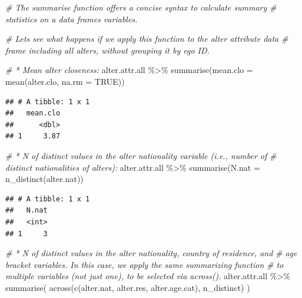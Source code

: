 \documentclass[
]{book}
\newenvironment{Shaded}{\begin{snugshade}}{\end{snugshade}}
\newcommand{\AttributeTok}[1]{\textcolor[rgb]{0.77,0.63,0.00}{#1}}
\newcommand{\CommentTok}[1]{\textcolor[rgb]{0.56,0.35,0.01}{\textit{#1}}}
\newcommand{\ConstantTok}[1]{\textcolor[rgb]{0.00,0.00,0.00}{#1}}
\newcommand{\FunctionTok}[1]{\textcolor[rgb]{0.00,0.00,0.00}{#1}}
\newcommand{\NormalTok}[1]{#1}
\newcommand{\SpecialCharTok}[1]{\textcolor[rgb]{0.00,0.00,0.00}{#1}}
\begin{document}
\begin{Shaded}
\begin{Highlighting}[]
\CommentTok{\# The summarise function offers a concise syntax to calculate summary }
\CommentTok{\# statistics on a data frame\textquotesingle{}s variables. }

\CommentTok{\# Let\textquotesingle{}s see what happens if we apply this function to the alter attribute data}
\CommentTok{\# frame including all alters, without grouping it by ego ID.}

\CommentTok{\# * Mean alter closeness:}
\NormalTok{alter.attr.all }\SpecialCharTok{\%\textgreater{}\%}
  \FunctionTok{summarise}\NormalTok{(}\AttributeTok{mean.clo =} \FunctionTok{mean}\NormalTok{(alter.clo, }\AttributeTok{na.rm =} \ConstantTok{TRUE}\NormalTok{))}
\end{Highlighting}
\end{Shaded}

\begin{verbatim}
## # A tibble: 1 x 1
##   mean.clo
##      <dbl>
## 1     3.87
\end{verbatim}

\begin{Shaded}
\begin{Highlighting}[]
\CommentTok{\# * N of distinct values in the alter nationality variable (i.e., number of }
\CommentTok{\# distinct nationalities of alters):}
\NormalTok{alter.attr.all }\SpecialCharTok{\%\textgreater{}\%}
  \FunctionTok{summarise}\NormalTok{(}\AttributeTok{N.nat =} \FunctionTok{n\_distinct}\NormalTok{(alter.nat))}
\end{Highlighting}
\end{Shaded}

\begin{verbatim}
## # A tibble: 1 x 1
##   N.nat
##   <int>
## 1     3
\end{verbatim}

\begin{Shaded}
\begin{Highlighting}[]
\CommentTok{\# * N of distinct values in the alter nationality, country of residence, and}
\CommentTok{\# age bracket variables. In this case, we apply the same summarizing function}
\CommentTok{\# to multiple variables (not just one), to be selected via across().}
\NormalTok{alter.attr.all }\SpecialCharTok{\%\textgreater{}\%}
  \FunctionTok{summarise}\NormalTok{(}
    \FunctionTok{across}\NormalTok{(}\FunctionTok{c}\NormalTok{(alter.nat, alter.res, alter.age.cat), }
\NormalTok{           n\_distinct)}
\NormalTok{    )}
\end{Highlighting}
\end{Shaded}
\end{document}

